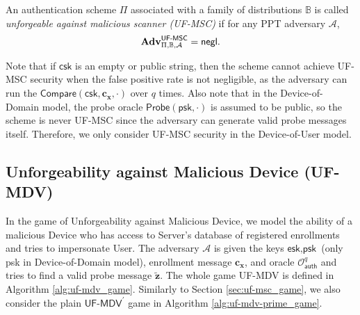 An authentication scheme $\Pi$ associated with a family of distributions $\mathbb{B}$ is called \emph{unforgeable against malicious scanner (UF-MSC)} if for any PPT adversary $\mathcal{A}$,
\[
	\mathbf{Adv}^{\textsf{UF-MSC}}_{\Pi, \mathbb{B}, \mathcal{A}} = \mathsf{negl}.
\]

Note that if $\textsf{csk}$ is an empty or public string, then the scheme cannot achieve UF-MSC security when the false positive rate is not negligible, as the adversary can run the $\textsf{Compare}(\textsf{csk}, \mathbf{c_x}, \cdot)$ over $q$ times.
Also note that in the Device-of-Domain model, the probe oracle $\textsf{Probe}(\textsf{psk}, \cdot)$ is assumed to be public, so the scheme is never UF-MSC since the adversary can generate valid probe messages itself. Therefore, we only consider UF-MSC security in the Device-of-User model. 


\subsection{Unforgeability against Malicious Device (UF-MDV)}
\label{sec:uf-mdv_game}

In the game of Unforgeability against Malicious Device, we model the ability of a malicious \textsf{Device} who has access to \textsf{Server}'s database of registered enrollments and tries to impersonate \textsf{User}.
The adversary $\mathcal{A}$ is given the keys $\textsf{esk}, \textsf{psk}$ (only \textsf{psk} in Device-of-Domain model), enrollment message $\mathbf{c_x}$, and oracle $\mathcal{O}_\textsf{auth}^q$ and tries to find a valid probe message $\mathbf{\tilde{z}}$.
The whole game \textsf{UF-MDV} is defined in Algorithm \ref{alg:uf-mdv_game}. Similarly to Section \ref{sec:uf-msc_game}, we also consider the plain $\textsf{UF-MDV}^\prime$ game in Algorithm \ref{alg:uf-mdv-prime_game}.

